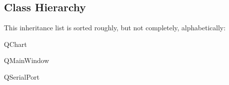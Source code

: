 \subsection{Class Hierarchy}
This inheritance list is sorted roughly, but not completely, alphabetically\+:\begin{DoxyCompactList}
\item Q\+Chart\begin{DoxyCompactList}
\item {}
\end{DoxyCompactList}
\item Q\+Main\+Window\begin{DoxyCompactList}
\item {}
\end{DoxyCompactList}
\item Q\+Serial\+Port\begin{DoxyCompactList}
\item {}
\end{DoxyCompactList}
\end{DoxyCompactList}
